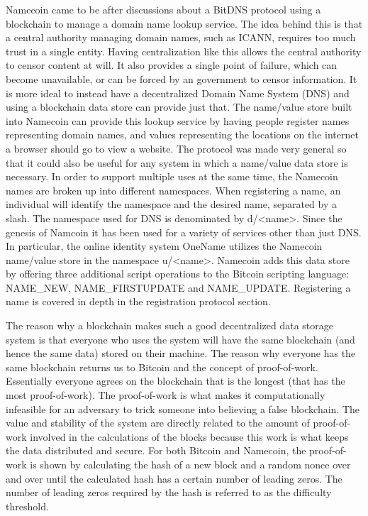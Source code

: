 Namecoin came to be after discussions about a BitDNS\cite{bitdns} protocol using a blockchain to manage a domain name lookup service. The idea behind this is that a central authority managing domain names, such as ICANN, requires too much trust in a single entity. Having centralization like this allows the central authority to censor content at will. It also provides a single point of failure, which can become unavailable, or can be forced by an government to censor information. It is more ideal to instead have a decentralized Domain Name System (DNS) and using a blockchain data store can provide just that.
The name/value store built into Namecoin can provide this lookup service by having people register names representing domain names, and values representing the locations on the internet a browser should go to view a website. The protocol was made very general so that it could also be useful for any system in which a name/value data store is necessary. In order to support multiple uses at the same time, the Namecoin names are broken up into different namespaces. When registering a name, an individual will identify the namespace and the desired name, separated by a slash. The namespace used for DNS is denominated by d/<name>. Since the genesis of Namcoin it has been used for a variety of services other than just DNS. In particular, the online identity system OneName utilizes the Namecoin name/value store in the namespace u/<name>. Namecoin adds this data store by offering three additional script operations to the Bitcoin scripting language: NAME\_NEW, NAME\_FIRSTUPDATE and NAME\_UPDATE. Registering a name is covered in depth in the registration protocol section. 

The reason  why a blockchain makes such a good decentralized data storage system is that everyone who uses the system will have the same blockchain (and hence the same data) stored on their machine. The reason why everyone has the same blockchain returns us to Bitcoin and the concept of proof-of-work. Essentially everyone agrees on the blockchain that is the longest (that has the most proof-of-work). The proof-of-work is what makes it computationally infeasible for an adversary to trick someone into believing a false blockchain. The value and stability of the system are directly related to the amount of proof-of-work involved in the calculations of the blocks because this work is what keeps the data distributed and secure. For both Bitcoin and Namecoin, the proof-of-work is shown by calculating the hash of a new block and a random nonce over and over until the calculated hash has a certain number of leading zeros. The number of leading zeros required by the hash is referred to as the difficulty threshold. 

